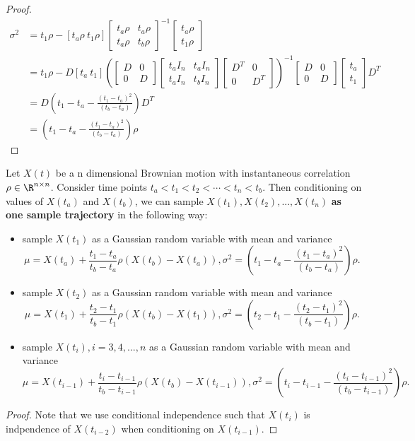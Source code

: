 \begin{refsection}
\begin{proof}
\begin{align*}
	\sigma^2 &= t_1\rho - [t_a\rho ~ t_1\rho]\begin{bmatrix}
	t_a\rho & t_a\rho\\
	t_a\rho & t_b\rho
	\end{bmatrix}^{-1}\begin{bmatrix}
	t_a\rho \\
	t_1\rho
	\end{bmatrix} \\
	&=t_1\rho - D [t_a  ~ t_1](\begin{bmatrix}
	D & 0\\
	0 & D
	\end{bmatrix}\begin{bmatrix}
	t_aI_n & t_aI_n\\
	t_aI_n & t_bI_n
	\end{bmatrix}\begin{bmatrix}
	D^T & 0\\
	0 & D^T
	\end{bmatrix})^{-1}\begin{bmatrix}
	D & 0\\
	0 & D
	\end{bmatrix}\begin{bmatrix}
	t_a \\
	t_1
	\end{bmatrix}D^T \\
	&= D(t_1-t_a - \frac{(t_1-t_a)^2}{(t_b-t_a)})D^T\\
	&= (t_1-t_a - \frac{(t_1-t_a)^2}{(t_b-t_a)})\rho
	\end{align*}
\end{proof}


\begin{method}
	Let $X(t)$ be a n dimensional Brownian motion with instantaneous correlation $\rho\in \R^{n\times n}$. Consider time points $t_a<t_1<t_2<\cdots < t_n<t_b$. Then conditioning on values of $X(t_a)$ and $X(t_b)$, we can sample $X(t_1),X(t_2),...,X(t_n)$ \textbf{as one sample trajectory} in the following way:
	\begin{itemize}
		\item sample $X(t_1)$ as a Gaussian random variable  with mean and variance $$\mu = X(t_a) + \frac{t_1-t_a}{t_b-t_a}\rho(X(t_b)-X(t_a)), \sigma^2 = (t_1-t_a - \frac{(t_1-t_a)^2}{(t_b-t_a)})\rho.$$
		\item sample $X(t_2)$ as a Gaussian random variable  with mean and variance $$\mu = X(t_1) + \frac{t_2-t_1}{t_b-t_1}\rho(X(t_b)-X(t_1)), \sigma^2 = (t_2-t_1 - \frac{(t_2-t_1)^2}{(t_b-t_1)})\rho.$$
		\item sample $X(t_i),i=3,4,...,n$ as a Gaussian random variable  with mean and variance $$\mu = X(t_{i-1}) + \frac{t_i-t_{i-1}}{t_b-t_{i-1}}\rho(X(t_b)-X(t_{i-1})), \sigma^2 = (t_i-t_{i-1} - \frac{(t_i-t_{i-1})^2}{(t_b-t_{i-1})})\rho.$$
	\end{itemize}
\end{method}
\begin{proof}
	Note that we use conditional independence such that $X(t_i)$ is indpendence of $X(t_{i-2})$ when conditioning on $X(t_{i-1})$.
\end{proof}



\end{refsection}

